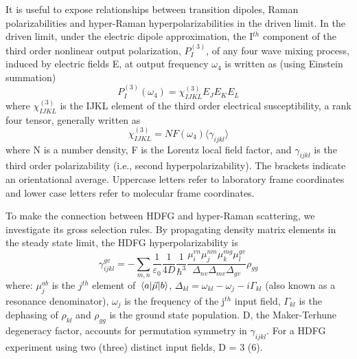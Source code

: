 \documentclass[aip, jcp, reprint, onecolumn]{revtex4-2}
\begin{document}
It is useful to expose relationships between transition dipoles, Raman polarizabilities and hyper-Raman hyperpolarizabilities in the driven limit. \cite{Druet1978, Simpson2004}
In the driven limit, under the electric dipole approximation, the I$^{th}$ component of the third order nonlinear output polarization, ${P}^{(3)}_I$, of any four wave mixing process, induced by electric fields E, at output frequency $\omega_4$ is written as (using Einstein summation) \cite{RN307}
\begin{equation} \label{polarization}
{P}^{(3)}_I (\omega_4)  = \chi^{(3)}_{IJKL} E_J E_K E_L 
\end{equation}
where $\chi^{(3)}_{IJKL}$ is the IJKL element of the third order electrical susceptibility, a rank four tensor, generally written as
\begin{equation}
	\chi^{(3)}_{IJKL} = NF(\omega_4) \langle \gamma_{ijkl} \rangle
\end{equation}
where N is a number density, F is the Lorentz local field factor, and $\gamma_{ijkl}$ is the third order polarizability (i.e., second hyperpolarizability). 
The brackets indicate an orientational average. 
Uppercase letters refer to laboratory frame coordinates and lower case letters refer to molecular frame coordinates.

To make the connection between HDFG and hyper-Raman scattering, we investigate its gross selection rules.
By propagating density matrix elements in the steady state limit, the HDFG hyperpolarizability is \cite{RN133}
\begin{equation}\label{sivegamma}
		\gamma_{ijkl}^{gv} =	- \sum_{m, n} \frac{1}{\varepsilon_0} \frac{1}{4D} \frac{1}{\hbar^3} \frac{\mu^{vn}_{i} \mu^{nm}_{j} \mu^{mg}_{k} \mu^{gv}_{l} }{\Delta_{nv} \Delta_{mv}\Delta_{gv}}  \rho_{gg}
\end{equation}
where: $\mu^{ab}_{j}$ is the $j^{th}$ element of $\mel{a}{\vec{\mu}}{b}$, $\Delta_{kl} = \omega_{kl} - \omega_{j} - i\Gamma_{kl}$ (also known as a resonance denominator), $\omega_j$ is the frequency of the j$^{th}$ input field, $\Gamma_{kl}$ is the dephasing of $\rho_{kl}$ and $\rho_{gg}$ is the ground state population.
D, the Maker-Terhune degeneracy factor, accounts for permutation symmetry in $\gamma_{ijkl}$.\cite{RN134} 
For a HDFG experiment using two (three) distinct input fields, D = 3 (6).
\end{document}
